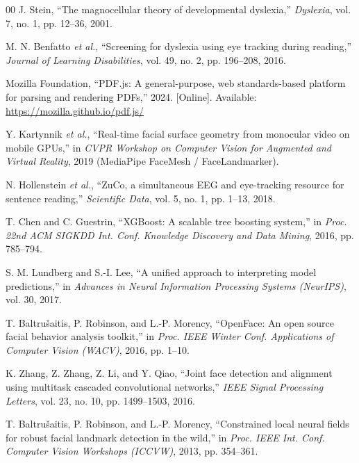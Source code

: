 \documentclass[conference]{IEEEtran}
\begin{document}
\begin{thebibliography}{00}
J. Stein,
``The magnocellular theory of developmental dyslexia,''
\textit{Dyslexia}, vol. 7, no. 1, pp. 12--36, 2001.

M. N. Benfatto \textit{et al.},
``Screening for dyslexia using eye tracking during reading,''
\textit{Journal of Learning Disabilities}, vol. 49, no. 2, pp. 196--208, 2016.

Mozilla Foundation,
``PDF.js: A general-purpose, web standards-based platform for parsing and rendering PDFs,''
2024. [Online]. Available: \url{https://mozilla.github.io/pdf.js/}

Y. Kartynnik \textit{et al.},
``Real-time facial surface geometry from monocular video on mobile GPUs,''
in \textit{CVPR Workshop on Computer Vision for Augmented and Virtual Reality}, 2019 (MediaPipe FaceMesh / FaceLandmarker).

N. Hollenstein \textit{et al.},
``ZuCo, a simultaneous EEG and eye-tracking resource for sentence reading,''
\textit{Scientific Data}, vol. 5, no. 1, pp. 1--13, 2018.

T. Chen and C. Guestrin,
``XGBoost: A scalable tree boosting system,''
in \textit{Proc. 22nd ACM SIGKDD Int. Conf. Knowledge Discovery and Data Mining}, 2016, pp. 785--794.

S. M. Lundberg and S.-I. Lee,
``A unified approach to interpreting model predictions,''
in \textit{Advances in Neural Information Processing Systems (NeurIPS)}, vol. 30, 2017.

T. Baltru\v{s}aitis, P. Robinson, and L.-P. Morency,
``OpenFace: An open source facial behavior analysis toolkit,''
in \textit{Proc. IEEE Winter Conf. Applications of Computer Vision (WACV)}, 2016, pp. 1--10.

K. Zhang, Z. Zhang, Z. Li, and Y. Qiao,
``Joint face detection and alignment using multitask cascaded convolutional networks,''
\textit{IEEE Signal Processing Letters}, vol. 23, no. 10, pp. 1499--1503, 2016.

T. Baltru\v{s}aitis, P. Robinson, and L.-P. Morency,
``Constrained local neural fields for robust facial landmark detection in the wild,''
in \textit{Proc. IEEE Int. Conf. Computer Vision Workshops (ICCVW)}, 2013, pp. 354--361.

\end{thebibliography}
\end{document}
